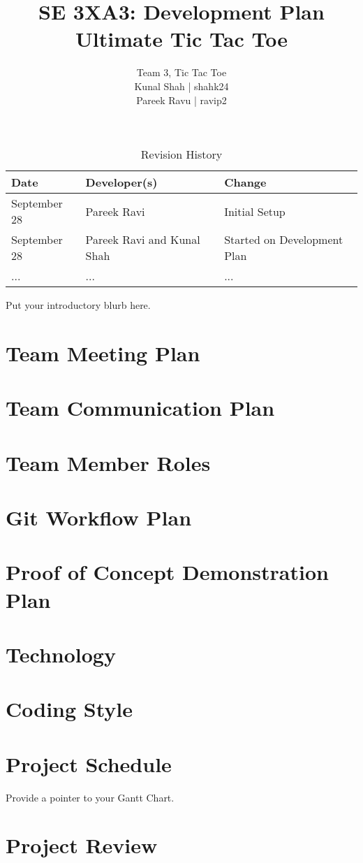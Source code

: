 \documentclass{article}
\title{SE 3XA3: Development Plan\\Ultimate Tic Tac Toe}
\author{Team 3, Tic Tac Toe
		\\ Kunal Shah | shahk24
		\\ Pareek Ravu | ravip2
}
\date{}
\begin{document}
\begin{table}[hp]
\caption{Revision History} \label{TblRevisionHistory}
\begin{tabularx}{\textwidth}{llX}
\toprule
\textbf{Date} & \textbf{Developer(s)} & \textbf{Change}\\
\midrule
September 28 & Pareek Ravi & Initial Setup\\
September 28 & Pareek Ravi and Kunal Shah & Started on Development Plan\\
... & ... & ...\\
\bottomrule
\end{tabularx}
\end{table}

\newpage

\maketitle

Put your introductory blurb here.

\section{Team Meeting Plan}

\section{Team Communication Plan}

\section{Team Member Roles}

\section{Git Workflow Plan}

\section{Proof of Concept Demonstration Plan}

\section{Technology}

\section{Coding Style}

\section{Project Schedule}

Provide a pointer to your Gantt Chart.

\section{Project Review}
\end{document}
